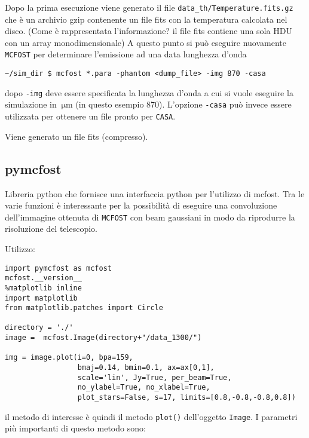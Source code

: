 \documentclass[DIN, pagenumber=false, fontsize=11pt, parskip=half]{scrartcl}
\begin{document}
Dopo la prima esecuzione viene generato il file \lstinline{data_th/Temperature.fits.gz} che è un archivio gzip contenente un file fits con la temperatura calcolata nel disco. (Come è rappresentata l'informazione? il file fits contiene una sola HDU con un array monodimensionale)
A questo punto si può eseguire nuovamente \lstinline{MCFOST} per determinare l'emissione ad una data lunghezza d'onda 
\begin{lstlisting}
~/sim_dir $ mcfost *.para -phantom <dump_file> -img 870 -casa
\end{lstlisting}
dopo \lstinline{-img} deve essere specificata la lunghezza d'onda a cui si vuole eseguire la simulazione in $\SI{}{\micro\m}$ (in questo esempio 870). L'opzione \lstinline{-casa} può invece essere utilizzata per ottenere un file pronto per \lstinline{CASA}.

Viene generato un file fits (compresso).

\subsection{pymcfost}
Libreria python che fornisce una interfaccia python per l'utilizzo di mcfost. Tra le varie funzioni è interessante per la possibilità di eseguire una convoluzione dell'immagine ottenuta di \lstinline{MCFOST} con beam gaussiani in modo da riprodurre la risoluzione del telescopio.

Utilizzo:
\begin{lstlisting}
import pymcfost as mcfost
mcfost.__version__
%matplotlib inline
import matplotlib 
from matplotlib.patches import Circle

directory = './'
image =  mcfost.Image(directory+"/data_1300/")

img = image.plot(i=0, bpa=159,
                 bmaj=0.14, bmin=0.1, ax=ax[0,1],
                 scale='lin', Jy=True, per_beam=True,
                 no_ylabel=True, no_xlabel=True,
                 plot_stars=False, s=17, limits=[0.8,-0.8,-0.8,0.8])
\end{lstlisting}

il metodo di interesse è quindi il metodo \lstinline{plot()} dell'oggetto \lstinline{Image}. I parametri più importanti di questo metodo sono:
\end{document}
